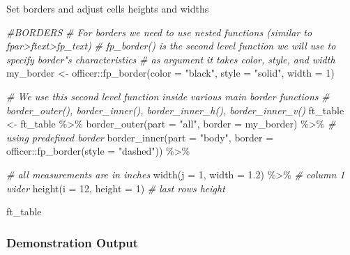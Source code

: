 \documentclass[
]{book}
\newenvironment{Shaded}{\begin{snugshade}}{\end{snugshade}}
\newcommand{\AttributeTok}[1]{\textcolor[rgb]{0.77,0.63,0.00}{#1}}
\newcommand{\CommentTok}[1]{\textcolor[rgb]{0.56,0.35,0.01}{\textit{#1}}}
\newcommand{\DecValTok}[1]{\textcolor[rgb]{0.00,0.00,0.81}{#1}}
\newcommand{\FloatTok}[1]{\textcolor[rgb]{0.00,0.00,0.81}{#1}}
\newcommand{\FunctionTok}[1]{\textcolor[rgb]{0.00,0.00,0.00}{#1}}
\newcommand{\NormalTok}[1]{#1}
\newcommand{\OtherTok}[1]{\textcolor[rgb]{0.56,0.35,0.01}{#1}}
\newcommand{\SpecialCharTok}[1]{\textcolor[rgb]{0.00,0.00,0.00}{#1}}
\newcommand{\StringTok}[1]{\textcolor[rgb]{0.31,0.60,0.02}{#1}}
\begin{document}
Set borders and adjust cells heights and widths

\begin{Shaded}
\begin{Highlighting}[]
\CommentTok{\#BORDERS}
\CommentTok{\# For borders we need to use nested functions (similar to fpar\textgreater{}ftext\textgreater{}fp\_text)}
\CommentTok{\# fp\_border() is the second level function we will use to specify border"s characteristics}
\CommentTok{\# as argument it takes color, style, and width}
\NormalTok{my\_border }\OtherTok{\textless{}{-}}\NormalTok{ officer}\SpecialCharTok{::}\FunctionTok{fp\_border}\NormalTok{(}\AttributeTok{color =} \StringTok{"black"}\NormalTok{, }\AttributeTok{style =} \StringTok{"solid"}\NormalTok{, }\AttributeTok{width =} \DecValTok{1}\NormalTok{)}

\CommentTok{\# We use this second level function inside various main border functions}
\CommentTok{\# border\_outer(), border\_inner(), border\_inner\_h(), border\_inner\_v()}
\NormalTok{ft\_table }\OtherTok{\textless{}{-}}\NormalTok{ ft\_table }\SpecialCharTok{\%\textgreater{}\%}
  \FunctionTok{border\_outer}\NormalTok{(}\AttributeTok{part =} \StringTok{"all"}\NormalTok{, }\AttributeTok{border =}\NormalTok{ my\_border) }\SpecialCharTok{\%\textgreater{}\%} \CommentTok{\# using predefined border}
  \FunctionTok{border\_inner}\NormalTok{(}\AttributeTok{part =} \StringTok{"body"}\NormalTok{, }\AttributeTok{border =}\NormalTok{ officer}\SpecialCharTok{::}\FunctionTok{fp\_border}\NormalTok{(}\AttributeTok{style =} \StringTok{"dashed"}\NormalTok{)) }\SpecialCharTok{\%\textgreater{}\%} 

  \CommentTok{\# all measurements are in inches}
  \FunctionTok{width}\NormalTok{(}\AttributeTok{j =} \DecValTok{1}\NormalTok{, }\AttributeTok{width =} \FloatTok{1.2}\NormalTok{) }\SpecialCharTok{\%\textgreater{}\%} \CommentTok{\# column 1 wider}
  \FunctionTok{height}\NormalTok{(}\AttributeTok{i =} \DecValTok{12}\NormalTok{, }\AttributeTok{height =} \DecValTok{1}\NormalTok{) }\CommentTok{\# last row\textquotesingle{}s height}

\NormalTok{ft\_table}
\end{Highlighting}
\end{Shaded}

\hypertarget{demonstration-output}{%
\subsubsection{Demonstration Output}\label{demonstration-output}}
\end{document}
